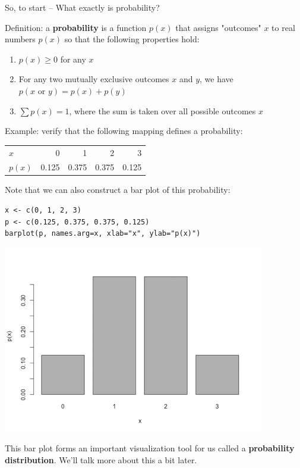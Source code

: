 \documentclass[11pt]{article}
\begin{document}
So, to start -- What exactly is probability?

Definition: a \textbf{probability} is a function $p(x)$ that assigns "outcomes" $x$ to real numbers $p(x)$ so that the following properties hold:

\begin{enumerate}
\item $p(x)\geq 0$ for any $x$
\item For any two mutually exclusive outcomes $x$ and $y$, we have $p(x\text{ or }y)=p(x)+p(y)$
\item $\sum p(x) = 1$, where the sum is taken over all possible outcomes $x$
\end{enumerate}

Example: verify that the following mapping defines a probability:

\begin{center}
\begin{tabular}{lrrrr}
$x$ & 0 & 1 & 2 & 3\\
$p(x)$ & 0.125 & 0.375 & 0.375 & 0.125\\
\end{tabular}
\end{center}

Note that we can also construct a bar plot of this probability:

\begin{verbatim}
x <- c(0, 1, 2, 3)
p <- c(0.125, 0.375, 0.375, 0.125)
barplot(p, names.arg=x, xlab="x", ylab="p(x)")
\end{verbatim}

\includegraphics[width=.9\linewidth]{figures/week1/barplot.png}


This bar plot forms an important visualization tool for us called a \textbf{probability distribution}.  We'll talk more about this a bit later.
\end{document}
